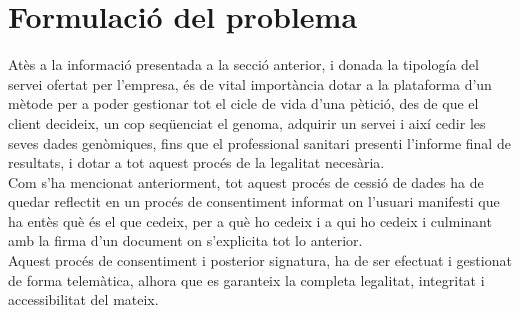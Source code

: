 \section{Formulació del problema}

Atès a la informació presentada a la secció anterior, i donada la tipología del servei ofertat per l'empresa, és de vital importància dotar a la plataforma d'un mètode per a poder gestionar tot el cicle de vida d'una pètició, des de que el client decideix, un cop seqüenciat el genoma, adquirir un servei i així cedir les seves dades genòmiques, fins que el professional sanitari presenti l'informe final de resultats, i dotar a tot aquest procés de la legalitat necesària.\\
\newline Com s'ha mencionat anteriorment, tot aquest procés de cessió de dades ha de quedar reflectit en un procés de consentiment informat on l'usuari manifesti que ha entès què és el que cedeix, per a què ho cedeix i a qui ho cedeix i culminant amb la firma d'un document on s'explicita tot lo anterior.\\
\newline Aquest procés de consentiment i posterior signatura, ha de ser efectuat i gestionat de forma telemàtica, alhora que es garanteix la completa legalitat, integritat i accessibilitat del mateix.
